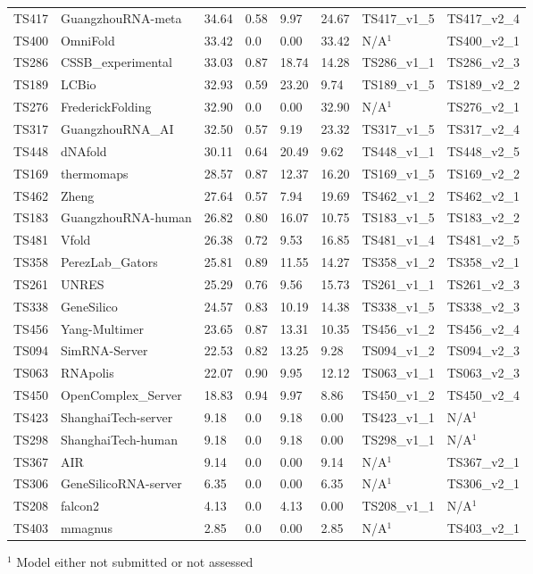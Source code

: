 \begin{table}[ht]
{\begin{tabular}{llllllll}
TS417 & GuangzhouRNA-meta & 34.64 & 0.58 & 9.97 & 24.67 & TS417\_v1\_5 & TS417\_v2\_4 \\ 
TS400 & OmniFold & 33.42 & 0.0 & 0.00 & 33.42 & N/A$^{1}$ & TS400\_v2\_1 \\ 
TS286 & CSSB\_experimental & 33.03 & 0.87 & 18.74 & 14.28 & TS286\_v1\_1 & TS286\_v2\_3 \\ 
TS189 & LCBio & 32.93 & 0.59 & 23.20 & 9.74 & TS189\_v1\_5 & TS189\_v2\_2 \\ 
TS276 & FrederickFolding & 32.90 & 0.0 & 0.00 & 32.90 & N/A$^{1}$ & TS276\_v2\_1 \\ 
TS317 & GuangzhouRNA\_AI & 32.50 & 0.57 & 9.19 & 23.32 & TS317\_v1\_5 & TS317\_v2\_4 \\ 
TS448 & dNAfold & 30.11 & 0.64 & 20.49 & 9.62 & TS448\_v1\_1 & TS448\_v2\_5 \\ 
TS169 & thermomaps & 28.57 & 0.87 & 12.37 & 16.20 & TS169\_v1\_5 & TS169\_v2\_2 \\ 
TS462 & Zheng & 27.64 & 0.57 & 7.94 & 19.69 & TS462\_v1\_2 & TS462\_v2\_1 \\ 
TS183 & GuangzhouRNA-human & 26.82 & 0.80 & 16.07 & 10.75 & TS183\_v1\_5 & TS183\_v2\_2 \\ 
TS481 & Vfold & 26.38 & 0.72 & 9.53 & 16.85 & TS481\_v1\_4 & TS481\_v2\_5 \\ 
TS358 & PerezLab\_Gators & 25.81 & 0.89 & 11.55 & 14.27 & TS358\_v1\_2 & TS358\_v2\_1 \\ 
TS261 & UNRES & 25.29 & 0.76 & 9.56 & 15.73 & TS261\_v1\_1 & TS261\_v2\_3 \\ 
TS338 & GeneSilico & 24.57 & 0.83 & 10.19 & 14.38 & TS338\_v1\_5 & TS338\_v2\_3 \\ 
TS456 & Yang-Multimer & 23.65 & 0.87 & 13.31 & 10.35 & TS456\_v1\_2 & TS456\_v2\_4 \\ 
TS094 & SimRNA-Server & 22.53 & 0.82 & 13.25 & 9.28 & TS094\_v1\_2 & TS094\_v2\_3 \\ 
TS063 & RNApolis & 22.07 & 0.90 & 9.95 & 12.12 & TS063\_v1\_1 & TS063\_v2\_3 \\ 
TS450 & OpenComplex\_Server & 18.83 & 0.94 & 9.97 & 8.86 & TS450\_v1\_2 & TS450\_v2\_4 \\ 
TS423 & ShanghaiTech-server & 9.18 & 0.0 & 9.18 & 0.00 & TS423\_v1\_1 & N/A$^{1}$ \\ 
TS298 & ShanghaiTech-human & 9.18 & 0.0 & 9.18 & 0.00 & TS298\_v1\_1 & N/A$^{1}$ \\ 
TS367 & AIR & 9.14 & 0.0 & 0.00 & 9.14 & N/A$^{1}$ & TS367\_v2\_1 \\ 
TS306 & GeneSilicoRNA-server & 6.35 & 0.0 & 0.00 & 6.35 & N/A$^{1}$ & TS306\_v2\_1 \\ 
TS208 & falcon2 & 4.13 & 0.0 & 4.13 & 0.00 & TS208\_v1\_1 & N/A$^{1}$ \\ 
TS403 & mmagnus & 2.85 & 0.0 & 0.00 & 2.85 & N/A$^{1}$ & TS403\_v2\_1 \\ 
\bottomrule
\end{tabular}%
}
\begin{flushleft}\footnotesize $^{1}$ Model either not submitted or not assessed\end{flushleft}
\end{table}

